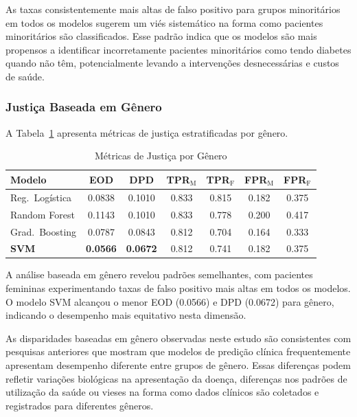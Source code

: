 As taxas consistentemente mais altas de falso positivo para grupos 
minoritários em todos os modelos sugerem um viés sistemático na forma 
como pacientes minoritários são classificados. Esse padrão indica que 
os modelos são mais propensos a identificar incorretamente pacientes 
minoritários como tendo diabetes quando não têm, potencialmente levando 
a intervenções desnecessárias e custos de saúde.

\subsubsection{Justiça Baseada em Gênero}

A Tabela~\ref{tab:gender_fairness} apresenta métricas de justiça 
estratificadas por gênero.

\begin{table}[H]
\centering
\caption{Métricas de Justiça por Gênero}
\begin{tabular}{lcccccc}
\toprule
\textbf{Modelo} & \textbf{EOD} & \textbf{DPD} & 
\textbf{TPR$_{\text{M}}$} & \textbf{TPR$_{\text{F}}$} & 
\textbf{FPR$_{\text{M}}$} & \textbf{FPR$_{\text{F}}$} \\
\midrule
Reg.\ Logística & 0.0838 & 0.1010 & 0.833 & 0.815 & 0.182 & 0.375 \\
Random Forest & 0.1143 & 0.1010 & 0.833 & 0.778 & 0.200 & 0.417 \\
Grad.\ Boosting & 0.0787 & 0.0843 & 0.812 & 0.704 & 0.164 & 0.333 \\
\textbf{SVM} & \textbf{0.0566} & \textbf{0.0672} & 0.812 & 0.741 & 0.182 & 0.375 \\
\bottomrule
\end{tabular}
\label{tab:gender_fairness}
\end{table}

A análise baseada em gênero revelou padrões semelhantes, com pacientes 
femininas experimentando taxas de falso positivo mais altas em todos os 
modelos. O modelo SVM alcançou o menor EOD (0.0566) e DPD (0.0672) para 
gênero, indicando o desempenho mais equitativo nesta dimensão.

As disparidades baseadas em gênero observadas neste estudo são consistentes 
com pesquisas anteriores que mostram que modelos de predição clínica 
frequentemente apresentam desempenho diferente entre grupos de gênero. 
Essas diferenças podem refletir variações biológicas na apresentação da 
doença, diferenças nos padrões de utilização da saúde ou vieses na forma 
como dados clínicos são coletados e registrados para diferentes gêneros.

